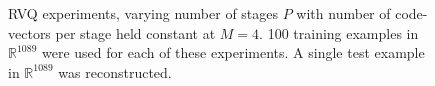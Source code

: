 \begin{figure}[h]
\caption{RVQ experiments, varying number of stages $P$ with number of code-vectors per stage held constant at $M=4$. 100 training examples in $\mathbb{R}^{1089}$ were used for each of these experiments.  A single test example in $\mathbb{R}^{1089}$ was reconstructed.}
\label{fig:RVQ_results_varyingP}
\end{figure}


\newpage
